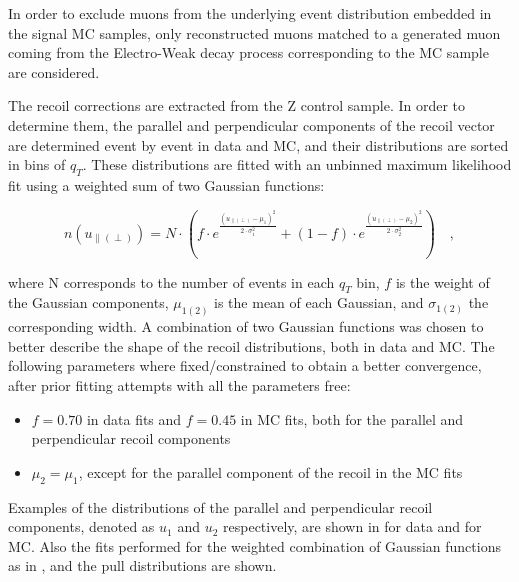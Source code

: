 In order to exclude muons from the underlying event distribution embedded in the signal MC samples, only reconstructed muons matched to a generated muon coming from the Electro-Weak decay process corresponding to the MC sample are considered.

The recoil corrections are extracted from the Z control sample. In order to determine them, the parallel and perpendicular components of the recoil vector are determined event by event in data and MC, and their distributions are sorted in bins of $q_{T}$. These distributions are fitted with an unbinned maximum likelihood fit using a weighted sum of two Gaussian functions:

\begin{equation}\label{eq:gaussFit}
n(u_{\parallel(\perp)}) = N \cdot \left( f \cdot  e^{\frac{(u_{\parallel(\perp)} - \mu_{1})^{2}}{2 \cdot \sigma_{1}^{2}}}  + (1-f)\cdot e^{\frac{(u_{\parallel(\perp)} - \mu_{2})^{2}}{2 \cdot \sigma_{2}^{2}}}  \right) \quad,
\end{equation}

where N corresponds to the number of events in each  $q_{T}$ bin, $f$ is the weight of the Gaussian components, $\mu_{1(2)}$ is the mean of each Gaussian, and  $\sigma_{1(2)}$ the corresponding width. A combination of two Gaussian functions was chosen to better describe the shape of the recoil distributions, both in data and MC. The following parameters where fixed/constrained to obtain a better convergence, after prior fitting attempts with all the parameters free: 

\begin{itemize}
\item $f = 0.70$ in data fits and $f = 0.45$ in MC fits, both for the parallel and perpendicular recoil components
\item $\mu_{2} = \mu_{1}$, except for the parallel component of the recoil in the MC fits
\end{itemize}

Examples of the distributions of the parallel and perpendicular recoil components, denoted as $u_{1}$ and $u_{2}$ respectively, are shown in  for data and  for MC. Also the fits performed for the weighted combination of Gaussian functions as in , and the pull distributions are shown.


